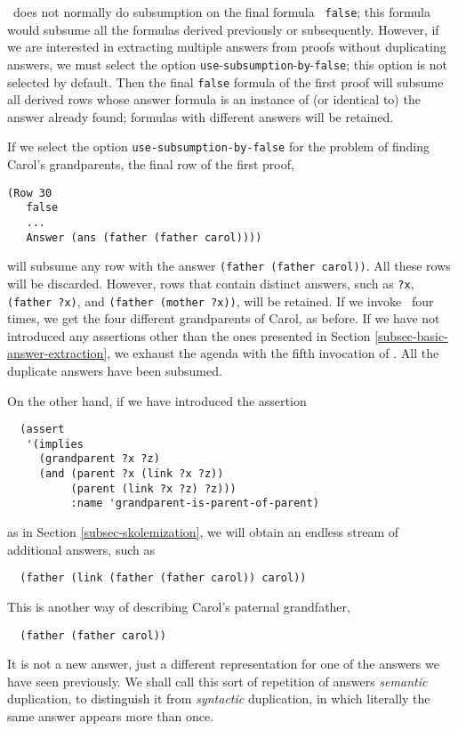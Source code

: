  \Snark\  does not normally do subsumption on the final formula {\tt
false}; this formula would subsume all the formulas derived previously
or subsequently.  However, if we are interested in extracting multiple
answers from proofs without duplicating answers, we must select the
option {\tt use}-{\tt subsumption}-{\tt by}-{\tt false}; this option
is not selected by default.  Then the final {\tt false} formula of the
first proof will subsume all derived rows whose answer formula is
an instance of (or identical to) the answer already found; formulas
with different answers will be retained.

If we select the option {\tt use-subsumption-by-false} for
the problem of finding Carol's grandparents, the final row of the
first proof,
\begin{verbatim}
(Row 30
   false
   ...
   Answer (ans (father (father carol))))
\end{verbatim}
will subsume any row with the answer \verb'(father (father carol))'.
All these rows will be discarded.  However, rows that contain
distinct answers, such as \verb'?x', \verb'(father ?x)', and
\verb'(father (mother ?x))', will be retained.
If we invoke \snark\  four
times, we get the four different grandparents of Carol, as before.
If we have not introduced any assertions other than the ones presented in
Section \ref{subsec-basic-answer-extraction}, we exhaust the agenda
with the fifth invocation of \snark\/.  All the duplicate answers have
been subsumed.

On the other hand, if we have introduced the assertion
\begin{verbatim}
  (assert
   '(implies
     (grandparent ?x ?z)
     (and (parent ?x (link ?x ?z))
          (parent (link ?x ?z) ?z)))
          :name 'grandparent-is-parent-of-parent)
\end{verbatim}
as in Section \ref{subsec-skolemization},
we will obtain an endless stream of additional answers, such as
\begin{verbatim}
  (father (link (father (father carol)) carol))
\end{verbatim}
This is another way of describing Carol's paternal grandfather,
\begin{verbatim}
  (father (father carol))
\end{verbatim}
It is not a new answer, just a different representation for one of the
answers we have seen previously.  We shall call this sort of
repetition of answers {\em semantic} duplication, to distinguish it
from {\em  syntactic} duplication, in which literally the same answer
appears more than once.

